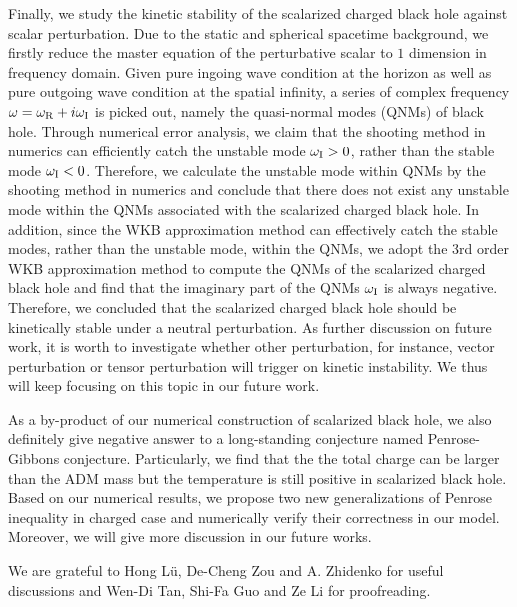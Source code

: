 \documentclass[pr, twocolumn, preprintnumbers, showpacs,footnoteadded, superscriptaddress,nofootinbib,longbibliography]{revtex4-1}
\begin{document}
Finally, we study the kinetic stability of the scalarized charged black hole against scalar perturbation. Due to the static and spherical spacetime background,  we firstly reduce the master equation of the perturbative scalar to $1$ dimension in frequency domain. Given pure ingoing wave condition at the horizon as well as pure outgoing wave condition at the spatial infinity, a series of complex frequency $\omega=\omega_{\rm R}+ i \omega_{\rm I}$ is picked out, namely the quasi-normal modes (QNMs) of  black hole. Through numerical error analysis, we claim that the shooting method in numerics can efficiently catch the unstable mode $\omega_{\rm I}>0$, rather than the stable mode $\omega_{\rm I}<0$. Therefore, we calculate the unstable mode within QNMs by the shooting method in numerics and conclude that there does not exist any unstable mode within the QNMs associated with the scalarized charged black hole. In addition, since the WKB approximation method can effectively catch the stable modes, rather than the unstable mode, within the QNMs, we adopt the 3rd order WKB approximation method to compute the QNMs of the scalarized charged black hole and find that the imaginary part of the QNMs $\omega_{\rm I}$ is always negative. Therefore, we concluded that the scalarized charged black hole should be kinetically stable under a neutral perturbation. As further discussion on future work, it is worth to investigate whether other perturbation, for instance, vector perturbation or tensor perturbation will trigger on kinetic instability. We thus will keep focusing on this topic in our future work.

As a by-product of our numerical construction of scalarized black hole, we also definitely give negative answer to a long-standing conjecture named Penrose-Gibbons conjecture. Particularly, we find that the the total charge can be larger than the ADM mass but the temperature is still positive in scalarized black hole. Based on our numerical results, we propose two new generalizations of Penrose inequality in charged case and numerically verify their correctness in our model. Moreover, we will give more discussion in our future works.



\acknowledgments
We are grateful to Hong L\"{u}, De-Cheng Zou and A. Zhidenko for useful discussions and Wen-Di Tan, Shi-Fa Guo and Ze Li for proofreading.

\appendix
\end{document}
